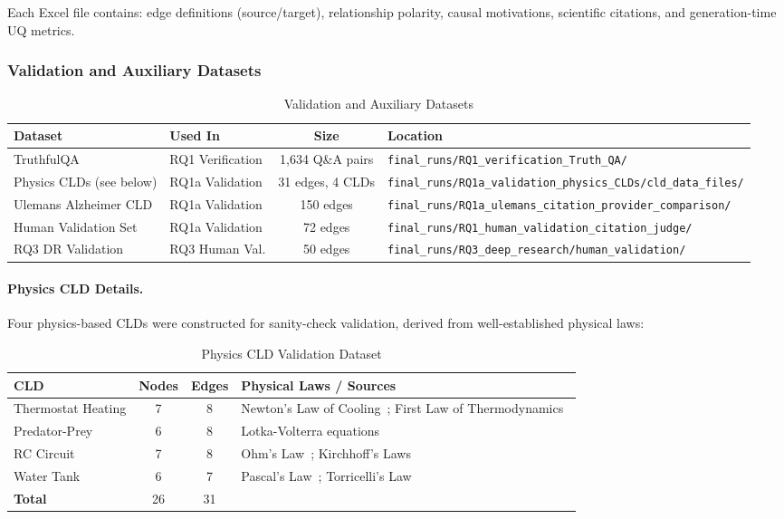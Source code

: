 Each Excel file contains: edge definitions (source/target), relationship polarity, causal motivations, scientific citations, and generation-time UQ metrics.

\subsubsection{Validation and Auxiliary Datasets}

\begin{table}[H]
\centering
\caption{Validation and Auxiliary Datasets}
\label{tab:validation_datasets}
\footnotesize
\begin{tabularx}{\textwidth}{@{}l l c X@{}}
\toprule
\textbf{Dataset} & \textbf{Used In} & \textbf{Size} & \textbf{Location} \\
\midrule
TruthfulQA~\cite{lin2022truthfulqa} & RQ1 Verification & 1,634 Q\&A pairs & \texttt{final\_runs/RQ1\_verification\_Truth\_QA/} \\
Physics CLDs (see below) & RQ1a Validation & 31 edges, 4 CLDs & \texttt{final\_runs/RQ1a\_validation\_physics\_CLDs/cld\_data\_files/} \\
Ulemans Alzheimer CLD & RQ1a Validation & 150 edges & \texttt{final\_runs/RQ1a\_ulemans\_citation\_provider\_comparison/} \\
Human Validation Set & RQ1a Validation & 72 edges & \texttt{final\_runs/RQ1\_human\_validation\_citation\_judge/} \\
RQ3 DR Validation & RQ3 Human Val. & 50 edges & \texttt{final\_runs/RQ3\_deep\_research/human\_validation/} \\
\bottomrule
\end{tabularx}
\end{table}

\paragraph{Physics CLD Details.} Four physics-based CLDs were constructed for sanity-check validation, derived from well-established physical laws:

\begin{table}[H]
\centering
\caption{Physics CLD Validation Dataset}
\label{tab:physics_cld_dataset}
\footnotesize
\begin{tabularx}{\textwidth}{@{}l c c X@{}}
\toprule
\textbf{CLD} & \textbf{Nodes} & \textbf{Edges} & \textbf{Physical Laws / Sources} \\
\midrule
Thermostat Heating & 7 & 8 & Newton's Law of Cooling~\cite{newton1701scala}; First Law of Thermodynamics~\cite{clausius1850heat} \\
Predator-Prey & 6 & 8 & Lotka-Volterra equations~\cite{lotka1925elements,volterra1928fluctuations} \\
RC Circuit & 7 & 8 & Ohm's Law~\cite{ohm1827galvanische}; Kirchhoff's Laws~\cite{kirchhoff1845durchgang} \\
Water Tank & 6 & 7 & Pascal's Law~\cite{pascal1663equilibre}; Torricelli's Law~\cite{torricelli1644opera} \\
\midrule
\textbf{Total} & 26 & 31 & \\
\bottomrule
\end{tabularx}
\end{table}


